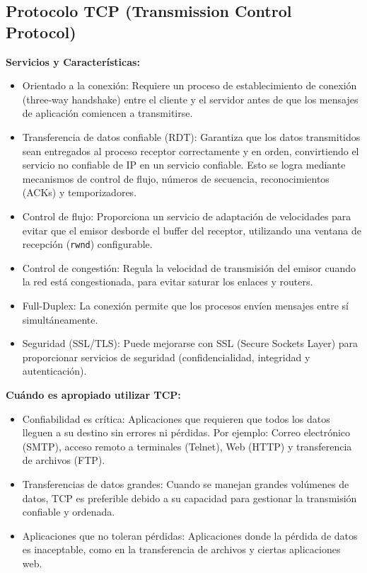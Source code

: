 \begin{enumerate}
    \subsection*{Protocolo TCP (Transmission Control Protocol)}
    
    \textbf{Servicios y Características:}
    \begin{itemize}
        \item Orientado a la conexión: Requiere un proceso de establecimiento de conexión (three-way handshake) entre el cliente y el servidor antes de que los mensajes de aplicación comiencen a transmitirse.
        \item Transferencia de datos confiable (RDT): Garantiza que los datos transmitidos sean entregados al proceso receptor correctamente y en orden, convirtiendo el servicio no confiable de IP en un servicio confiable. Esto se logra mediante mecanismos de control de flujo, números de secuencia, reconocimientos (ACKs) y temporizadores.
        \item Control de flujo: Proporciona un servicio de adaptación de velocidades para evitar que el emisor desborde el buffer del receptor, utilizando una ventana de recepción (\texttt{rwnd}) configurable.
        \item Control de congestión: Regula la velocidad de transmisión del emisor cuando la red está congestionada, para evitar saturar los enlaces y routers.
        \item Full-Duplex: La conexión permite que los procesos envíen mensajes entre sí simultáneamente.
        \item Seguridad (SSL/TLS): Puede mejorarse con SSL (Secure Sockets Layer) para proporcionar servicios de seguridad (confidencialidad, integridad y autenticación).
    \end{itemize}
    
    \textbf{Cuándo es apropiado utilizar TCP:}
    \begin{itemize}
        \item Confiabilidad es crítica: Aplicaciones que requieren que todos los datos lleguen a su destino sin errores ni pérdidas. Por ejemplo: Correo electrónico (SMTP), acceso remoto a terminales (Telnet), Web (HTTP) y transferencia de archivos (FTP).
        \item Transferencias de datos grandes: Cuando se manejan grandes volúmenes de datos, TCP es preferible debido a su capacidad para gestionar la transmisión confiable y ordenada.
        \item Aplicaciones que no toleran pérdidas: Aplicaciones donde la pérdida de datos es inaceptable, como en la transferencia de archivos y ciertas aplicaciones web.
    \end{itemize}
\end{enumerate}